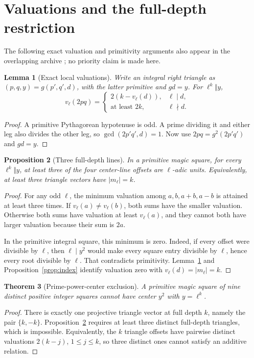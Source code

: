 \documentclass[11pt,letterpaper]{article}
\newtheorem{theorem}{Theorem}[section]
\newtheorem{proposition}[theorem]{Proposition}
\newtheorem{lemma}[theorem]{Lemma}
\theoremstyle{definition}\newtheorem{definition}[theorem]{Definition}
\theoremstyle{remark}\newtheorem{remark}[theorem]{Remark}
\begin{document}
\section{Valuations and the full-depth restriction}\label{sec:valuations}
The following exact valuation and primitivity arguments also appear in the overlapping archive \cite{Schwarz}; no priority claim is made here.
\begin{lemma}[Exact local valuations]\label{lem:valuation}
Write an integral right triangle as $(p,q,y)=g(p',q',d)$, with the latter primitive and $gd=y$. For $\ell^k\Vert y$,
\[
v_\ell(2pq)=
\begin{cases}
2(k-v_\ell(d)),&\ell\mid d,\\
\text{at least }2k,&\ell\nmid d.
\end{cases}
\]
\end{lemma}
\begin{proof}
A primitive Pythagorean hypotenuse is odd. A prime dividing it and either leg also divides the other leg, so $\gcd(2p'q',d)=1$. Now use $2pq=g^2(2p'q')$ and $gd=y$.
\end{proof}

\begin{proposition}[Three full-depth lines]\label{prop:depth}
In a primitive magic square, for every $\ell^k\Vert y$, at least three of the four center-line offsets are $\ell$-adic units. Equivalently, at least three triangle vectors have $|m_\ell|=k$.
\end{proposition}
\begin{proof}
For any odd $\ell$, the minimum valuation among $a,b,a+b,a-b$ is attained at least three times. If $v_\ell(a)\ne v_\ell(b)$, both sums have the smaller valuation. Otherwise both sums have valuation at least $v_\ell(a)$, and they cannot both have larger valuation because their sum is $2a$.

In the primitive integral square, this minimum is zero. Indeed, if every offset were divisible by $\ell$, then $\ell\mid y^2$ would make every square entry divisible by $\ell$, hence every root divisible by $\ell$. That contradicts primitivity. Lemma~\ref{lem:valuation} and Proposition~\ref{prop:index} identify valuation zero with $v_\ell(d)=|m_\ell|=k$.
\end{proof}

\begin{theorem}[Prime-power-center exclusion]\label{thm:A}
A primitive magic square of nine distinct positive integer squares cannot have center $y^2$ with $y=\ell^k$.
\end{theorem}
\begin{proof}
There is exactly one projective triangle vector at full depth $k$, namely the pair $\{k,-k\}$. Proposition~\ref{prop:depth} requires at least three distinct full-depth triangles, which is impossible. Equivalently, the $k$ triangle offsets have pairwise distinct valuations $2(k-j)$, $1\le j\le k$, so three distinct ones cannot satisfy an additive relation.
\end{proof}
\end{document}

